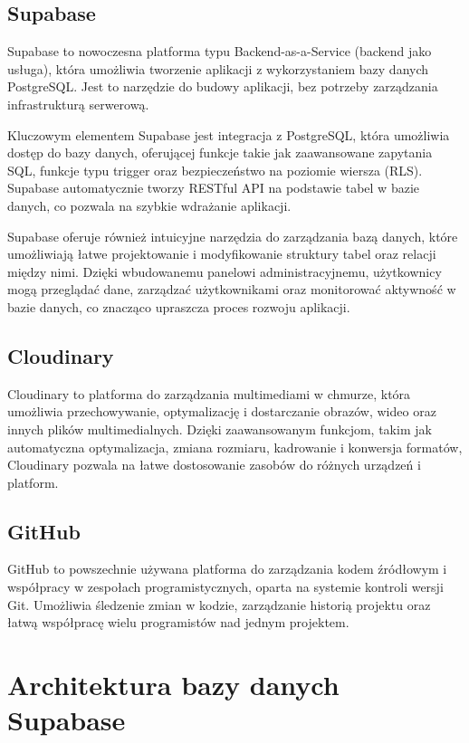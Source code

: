 \documentclass[12pt,twoside]{article}
\begin{document}
\subsection{Supabase}

Supabase to nowoczesna platforma typu Backend-as-a-Service (backend jako usługa), która umożliwia tworzenie
aplikacji z wykorzystaniem bazy danych PostgreSQL. Jest to narzędzie do budowy aplikacji, bez potrzeby 
zarządzania infrastrukturą serwerową.

Kluczowym elementem Supabase jest integracja z PostgreSQL, która umożliwia dostęp do bazy danych, oferującej
funkcje takie jak zaawansowane zapytania SQL, funkcje typu trigger oraz bezpieczeństwo na poziomie wiersza (RLS).
Supabase automatycznie tworzy RESTful API na podstawie tabel w bazie danych, co pozwala na szybkie
wdrażanie aplikacji. 

Supabase oferuje również intuicyjne narzędzia do zarządzania bazą danych, które umożliwiają łatwe projektowanie i 
modyfikowanie struktury tabel oraz relacji między nimi. Dzięki wbudowanemu panelowi administracyjnemu, użytkownicy 
mogą przeglądać dane, zarządzać użytkownikami oraz monitorować aktywność w bazie danych, co znacząco upraszcza 
proces rozwoju aplikacji.

\subsection{Cloudinary}

Cloudinary to platforma do zarządzania multimediami w chmurze, która umożliwia przechowywanie, optymalizację i 
dostarczanie obrazów, wideo oraz innych plików multimedialnych. Dzięki zaawansowanym funkcjom, takim jak 
automatyczna optymalizacja, zmiana rozmiaru, kadrowanie i konwersja formatów, Cloudinary pozwala na łatwe 
dostosowanie zasobów do różnych urządzeń i platform.

\subsection{GitHub}

GitHub to powszechnie używana platforma do zarządzania kodem źródłowym i współpracy w zespołach programistycznych, 
oparta na systemie kontroli wersji Git. Umożliwia śledzenie zmian w kodzie, zarządzanie historią projektu oraz
łatwą współpracę wielu programistów nad jednym projektem.

\clearpage

\section{Architektura bazy danych Supabase}
\end{document}
